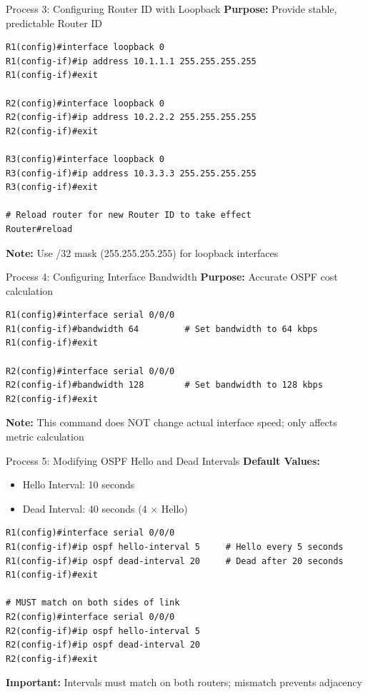 \documentclass[12pt,a4paper]{article}
\begin{document}
\begin{commandbox}{Process 3: Configuring Router ID with Loopback}
\textbf{Purpose:} Provide stable, predictable Router ID

\begin{lstlisting}
R1(config)#interface loopback 0
R1(config-if)#ip address 10.1.1.1 255.255.255.255
R1(config-if)#exit

R2(config)#interface loopback 0
R2(config-if)#ip address 10.2.2.2 255.255.255.255
R2(config-if)#exit

R3(config)#interface loopback 0
R3(config-if)#ip address 10.3.3.3 255.255.255.255
R3(config-if)#exit

# Reload router for new Router ID to take effect
Router#reload
\end{lstlisting}

\textbf{Note:} Use /32 mask (255.255.255.255) for loopback interfaces
\end{commandbox}

\begin{commandbox}{Process 4: Configuring Interface Bandwidth}
\textbf{Purpose:} Accurate OSPF cost calculation

\begin{lstlisting}
R1(config)#interface serial 0/0/0
R1(config-if)#bandwidth 64         # Set bandwidth to 64 kbps
R1(config-if)#exit

R2(config)#interface serial 0/0/0
R2(config-if)#bandwidth 128        # Set bandwidth to 128 kbps
R2(config-if)#exit
\end{lstlisting}

\textbf{Note:} This command does NOT change actual interface speed; only affects metric calculation
\end{commandbox}

\begin{commandbox}{Process 5: Modifying OSPF Hello and Dead Intervals}
\textbf{Default Values:}
\begin{itemize}[noitemsep]
    \item Hello Interval: 10 seconds
    \item Dead Interval: 40 seconds (4 $\times$ Hello)
\end{itemize}

\begin{lstlisting}
R1(config)#interface serial 0/0/0
R1(config-if)#ip ospf hello-interval 5     # Hello every 5 seconds
R1(config-if)#ip ospf dead-interval 20     # Dead after 20 seconds
R1(config-if)#exit

# MUST match on both sides of link
R2(config)#interface serial 0/0/0
R2(config-if)#ip ospf hello-interval 5
R2(config-if)#ip ospf dead-interval 20
R2(config-if)#exit
\end{lstlisting}

\textbf{Important:} Intervals must match on both routers; mismatch prevents adjacency
\end{commandbox}
\end{document}
